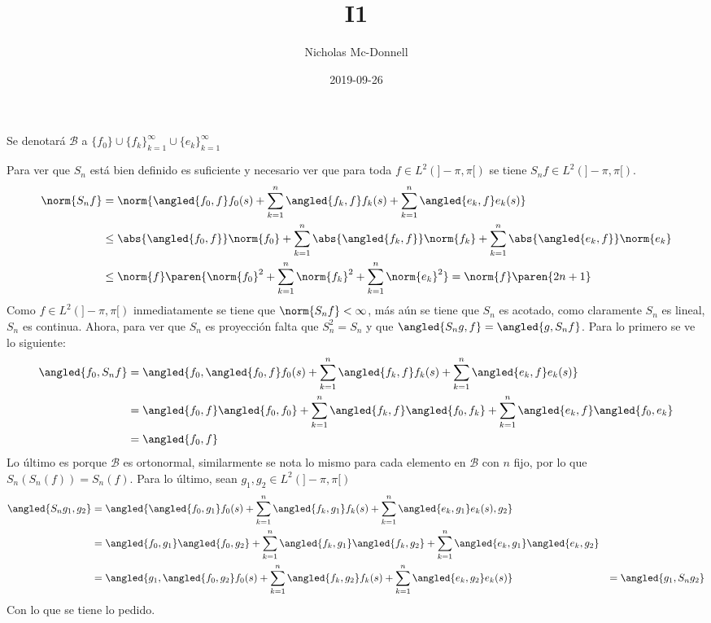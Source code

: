 \documentclass{homework}
\title{I1}
\date{2019-09-26}
\author{Nicholas Mc-Donnell}
\newcommand{\LP}{\ensuremath{L^2(]-\pi,\pi[)} }
\begin{document}
\maketitle
\newpage
{}
Se denotará \(\mathcal{B}\) a \(\{f_0\}\cup\{f_k\}_{k=1}^\infty\cup\{e_k\}_{k=1}^\infty\)

\begin{sol}[1.a]
    Para ver que \(S_n\) está bien definido es suficiente y necesario ver que para toda \(f\in\LP\) se tiene \(S_n f\in\LP\).
    \begin{align*}
        \norm{S_n f}&=\norm{\angled{f_0,f}f_0(s)+\sum_{k=1}^n\angled{f_k,f}f_k(s)+\sum_{k=1}^n\angled{e_k,f}e_k(s)}\\
        &\leq\abs{\angled{f_0,f}}\norm{f_0}+\sum_{k=1}^n\abs{\angled{f_k,f}}\norm{f_k}+\sum_{k=1}^n\abs{\angled{e_k,f}}\norm{e_k}\\
        &\leq\norm{f}\paren{\norm{f_0}^2+\sum_{k=1}^n\norm{f_k}^2+\sum_{k=1}^n\norm{e_k}^2}=\norm{f}\paren{2n+1}
    \end{align*}
    Como \(f\in\LP\) inmediatamente se tiene que \(\norm{S_n f}<\infty\), más aún se tiene que \(S_n\) es acotado, como claramente \(S_n\) es lineal, \(S_n\) es continua. Ahora, para ver que \(S_n\) es proyección falta que \(S_n^2=S_n\) y que \(\angled{S_n g,f}=\angled{g,S_n f}\). Para lo primero se ve lo siguiente:
    \begin{align*}
        \angled{f_0,S_n f}&=\angled{f_0,\angled{f_0,f}f_0(s)+\sum_{k=1}^n\angled{f_k,f}f_k(s)+\sum_{k=1}^n\angled{e_k,f}e_k(s)}\\
        &=\angled{f_0,f}\angled{f_0,f_0}+\sum_{k=1}^n\angled{f_k,f}\angled{f_0,f_k}+\sum_{k=1}^n\angled{e_k,f}\angled{f_0,e_k}\\
        &=\angled{f_0,f}
    \end{align*}
    Lo último es porque \(\mathcal{B}\) es ortonormal, similarmente se nota lo mismo para cada elemento en \(\mathcal{B}\) con \(n\) fijo, por lo que \(S_n(S_n(f))=S_n(f)\). Para lo último, sean \(g_1,g_2\in\LP\)
    \begin{align*}
        \angled{S_n g_1,g_2}&=\angled{\angled{f_0,g_1}f_0(s)+\sum_{k=1}^n\angled{f_k,g_1}f_k(s)+\sum_{k=1}^n\angled{e_k,g_1}e_k(s),g_2}\\
        &=\angled{f_0,g_1}\angled{f_0,g_2}+\sum_{k=1}^n\angled{f_k,g_1}\angled{f_k,g_2}+\sum_{k=1}^n\angled{e_k,g_1}\angled{e_k,g_2}\\
        &=\angled{g_1,\angled{f_0,g_2}f_0(s)+\sum_{k=1}^n\angled{f_k,g_2}f_k(s)+\sum_{k=1}^n\angled{e_k,g_2}e_k(s)}
        &=\angled{g_1,S_n g_2}
    \end{align*}
    Con lo que se tiene lo pedido.
\end{sol}
\end{document}
